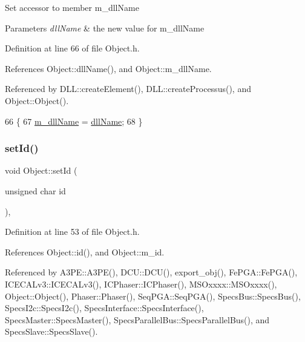 Set accessor to member m\+\_\+dll\+Name 
\begin{DoxyParams}{Parameters}
{\em dll\+Name} & the new value for m\+\_\+dll\+Name \\
\hline
\end{DoxyParams}


Definition at line 66 of file Object.\+h.



References Object\+::dll\+Name(), and Object\+::m\+\_\+dll\+Name.



Referenced by D\+L\+L\+::create\+Element(), D\+L\+L\+::create\+Processus(), and Object\+::\+Object().


\begin{DoxyCode}
66                                       \{
67     \hyperlink{classObject_a01afbeacebb8db6831559972ec362eb3}{m\_dllName} = \hyperlink{classObject_a2e3947f2870094c332d7454117f3ec63}{dllName};
68   \}
\end{DoxyCode}
\mbox{\label{classObject_a398fe08cba594a0ce6891d59fe4f159f}} 
\subsubsection{\texorpdfstring{set\+Id()}{setId()}}
{\footnotesize\ttfamily void Object\+::set\+Id (\begin{DoxyParamCaption}\item[{unsigned char}]{id }\end{DoxyParamCaption})\hspace{0.3cm}{\ttfamily [inline]}, {\ttfamily [inherited]}}



Definition at line 53 of file Object.\+h.



References Object\+::id(), and Object\+::m\+\_\+id.



Referenced by A3\+P\+E\+::\+A3\+P\+E(), D\+C\+U\+::\+D\+C\+U(), export\+\_\+obj(), Fe\+P\+G\+A\+::\+Fe\+P\+G\+A(), I\+C\+E\+C\+A\+Lv3\+::\+I\+C\+E\+C\+A\+Lv3(), I\+C\+Phaser\+::\+I\+C\+Phaser(), M\+S\+Oxxxx\+::\+M\+S\+Oxxxx(), Object\+::\+Object(), Phaser\+::\+Phaser(), Seq\+P\+G\+A\+::\+Seq\+P\+G\+A(), Specs\+Bus\+::\+Specs\+Bus(), Specs\+I2c\+::\+Specs\+I2c(), Specs\+Interface\+::\+Specs\+Interface(), Specs\+Master\+::\+Specs\+Master(), Specs\+Parallel\+Bus\+::\+Specs\+Parallel\+Bus(), and Specs\+Slave\+::\+Specs\+Slave().


